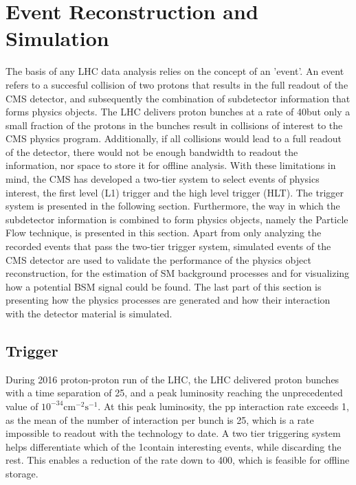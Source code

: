 \chapter{Event Reconstruction and Simulation}

The basis of any LHC data analysis relies on the concept of an 'event'. 
An event refers to a succesful collision of two protons that results in the full readout of the CMS detector, and subsequently the combination of subdetector information that forms physics objects. 
The LHC delivers proton bunches at a rate of 40\MHz but only a small fraction of the protons in the bunches result in collisions of interest to the CMS physics program.
Additionally, if all collisions would lead to a full readout of the detector, there would not be enough bandwidth to readout the information, nor space to store it for offline analysis. 
With these limitations in mind, the CMS has developed a two-tier system to select events of physics interest, the first level (L1) trigger and the high level trigger (HLT). 
The trigger system is presented in the following section. 
Furthermore, the way in which the subdetector information is combined to form physics objects, namely the Particle Flow technique, is presented in this section. 
Apart from only analyzing the recorded events that pass the two-tier trigger system, simulated events of the CMS detector are used to validate the performance of the physics object reconstruction, for the estimation of SM background processes and for visualizing how a potential BSM signal could be found. 
The last part of this section is presenting how the physics processes are generated and how their interaction with the detector material is simulated. 
\section{Trigger}
\label{eventReconstructionSimulation}
During 2016 proton-proton run of the LHC, the LHC delivered proton bunches with a time separation of 25\ns, and a peak luminosity reaching the unprecedented value of $10^{-34}\mathrm{cm}^{-2}\mathrm{s}^{-1}$. 
At this peak luminosity, the pp interaction rate exceeds 1\GHz, as the mean of the number of interaction per bunch is 25, which is a rate impossible to readout with the technology to date.   
A two tier triggering system helps differentiate which of the 1\GHz contain interesting events, while discarding the rest. 
This enables a reduction of the rate down to 400\Hz, which is feasible for offline storage.   
